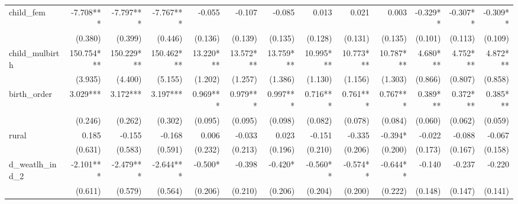 \begin{tabular}{lrrrrrrrrrrrr}
child\_fem                                  &    -7.708*** &    -7.797*** &    -7.767*** &       -0.055 &       -0.107 &       -0.085 &        0.013 &        0.021 &        0.003 &     -0.329** &     -0.307** &     -0.309** \\ 
                                            &      (0.380) &      (0.399) &      (0.446) &      (0.136) &      (0.139) &      (0.135) &      (0.128) &      (0.131) &      (0.135) &      (0.101) &      (0.113) &      (0.109) \\ 
child\_mulbirth                             &   150.754*** &   150.229*** &   150.462*** &    13.220*** &    13.572*** &    13.759*** &    10.995*** &    10.773*** &    10.787*** &     4.680*** &     4.752*** &     4.872*** \\ 
                                            &      (3.935) &      (4.400) &      (5.155) &      (1.202) &      (1.257) &      (1.386) &      (1.130) &      (1.156) &      (1.303) &      (0.866) &      (0.807) &      (0.858) \\ 
birth\_order                                &     3.029*** &     3.172*** &     3.197*** &     0.969*** &     0.979*** &     0.997*** &     0.716*** &     0.761*** &     0.767*** &     0.389*** &     0.372*** &     0.385*** \\ 
                                            &      (0.246) &      (0.262) &      (0.302) &      (0.095) &      (0.095) &      (0.098) &      (0.082) &      (0.078) &      (0.084) &      (0.060) &      (0.062) &      (0.059) \\ 
rural                                       &        0.185 &       -0.155 &       -0.168 &        0.006 &       -0.033 &        0.023 &       -0.151 &       -0.335 &      -0.394* &       -0.022 &       -0.088 &       -0.067 \\ 
                                            &      (0.631) &      (0.583) &      (0.591) &      (0.232) &      (0.213) &      (0.196) &      (0.210) &      (0.206) &      (0.200) &      (0.173) &      (0.167) &      (0.158) \\ 
d\_weatlh\_ind\_2                           &    -2.101*** &    -2.479*** &    -2.644*** &      -0.500* &       -0.398 &      -0.420* &     -0.560** &     -0.574** &     -0.644** &       -0.140 &       -0.237 &       -0.220 \\ 
                                            &      (0.611) &      (0.579) &      (0.564) &      (0.206) &      (0.210) &      (0.206) &      (0.204) &      (0.200) &      (0.222) &      (0.148) &      (0.147) &      (0.141) \\ 

\end{tabular}
